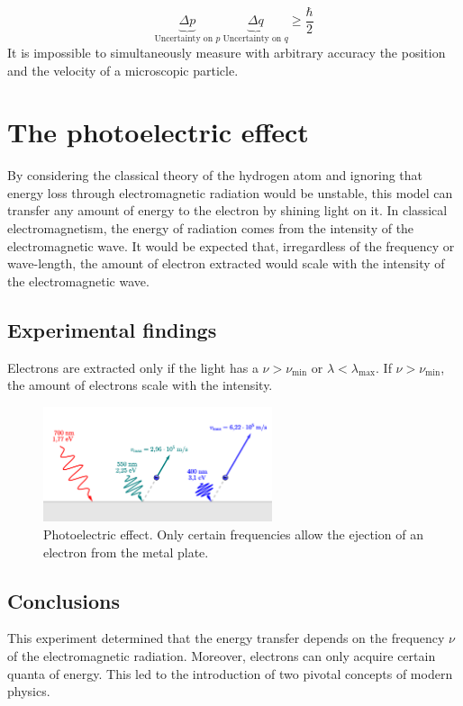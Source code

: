     $$\underbrace{\Delta p}_{\text{Uncertainty on }p}\ \underbrace{\Delta q }_{\text{Uncertainty on }q} \ge \frac{\hbar}{2}$$
	\noindent
    It is impossible to simultaneously measure with arbitrary accuracy the position and the velocity of a microscopic particle.

\section{The photoelectric effect}
By considering the classical theory of the hydrogen atom and ignoring that energy loss through electromagnetic radiation would be unstable, this model can transfer any amount of energy to the electron by shining light on it.
In classical electromagnetism, the energy of radiation comes from the intensity of the electromagnetic wave.
It would be expected that, irregardless of the frequency or wave-length, the amount of electron extracted would scale with the intensity of the electromagnetic wave.

  \subsection{Experimental findings}
  Electrons are extracted only if the light has a $\nu > \nu_{\min}$ or $\lambda<\lambda_{\max}$.
  If $\nu>\nu_{\min}$, the amount of electrons scale with the intensity.
\begin{figure}[h!]
    \centering
    \includegraphics[clip, width=0.6\textwidth]{photoelectric.png}
    \caption{\label{fig:photoelectric} Photoelectric effect. Only certain frequencies allow the ejection of an electron from the metal plate.}
\end{figure}
  \subsection{Conclusions}
  This experiment determined that the energy transfer depends on the frequency $\nu$ of the electromagnetic radiation.
  Moreover, electrons can only acquire certain quanta of energy.
  This led to the introduction of two pivotal concepts of modern physics.

